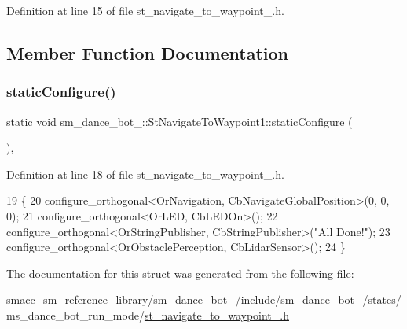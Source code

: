 Definition at line 15 of file st\+\_\+navigate\+\_\+to\+\_\+waypoint\+\_.\+h.



\subsection{Member Function Documentation}
\mbox{\label{structsm__dance__bot__2_1_1StNavigateToWaypoint1_a5461cc9743f6f36ab01092d59e65c75d}} 
\subsubsection{\texorpdfstring{static\+Configure()}{staticConfigure()}}
{\footnotesize\ttfamily static void sm\+\_\+dance\+\_\+bot\+\_\+::\+St\+Navigate\+To\+Waypoint1\+::static\+Configure (\begin{DoxyParamCaption}{ }\end{DoxyParamCaption})\hspace{0.3cm}{\ttfamily [inline]}, {\ttfamily [static]}}



Definition at line 18 of file st\+\_\+navigate\+\_\+to\+\_\+waypoint\+\_.\+h.


\begin{DoxyCode}
19   \{
20     configure\_orthogonal<OrNavigation, CbNavigateGlobalPosition>(0, 0, 0);
21     configure\_orthogonal<OrLED, CbLEDOn>();
22     configure\_orthogonal<OrStringPublisher, CbStringPublisher>(\textcolor{stringliteral}{"All Done!"});
23     configure\_orthogonal<OrObstaclePerception, CbLidarSensor>();
24   \}
\end{DoxyCode}


The documentation for this struct was generated from the following file\+:\begin{DoxyCompactItemize}
\item 
smacc\+\_\+sm\+\_\+reference\+\_\+library/sm\+\_\+dance\+\_\+bot\+\_/include/sm\+\_\+dance\+\_\+bot\+\_/states/ms\+\_\+dance\+\_\+bot\+\_\+run\+\_\+mode/\hyperlink{sm__dance__bot__2_2include_2sm__dance__bot__2_2states_2ms__dance__bot__run__mode_2st__navigate__to__waypoint__1_8h}{st\+\_\+navigate\+\_\+to\+\_\+waypoint\+\_.\+h}\end{DoxyCompactItemize}
